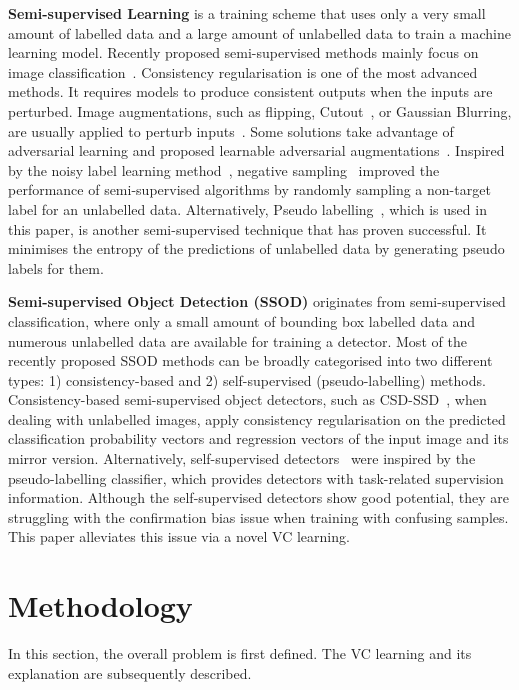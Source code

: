 \documentclass[runningheads]{llncs}
\begin{document}
\vspace{0.5em}\noindent\textbf{Semi-supervised Learning} is a training scheme that uses only a very small amount of labelled data and a large amount of unlabelled data to train a machine learning model. Recently proposed semi-supervised methods mainly focus on image classification~\cite{Kihyuk_2020_Fix,David_2019_Mix}. Consistency regularisation is one of the most advanced methods. It requires models to produce consistent outputs when the inputs are perturbed. Image augmentations, such as flipping, Cutout~\cite{Terrance_2017_Imp}, or Gaussian Blurring, are usually applied to perturb inputs~\cite{Samuli_2017_Tem,Philip_2014_Lea}. Some solutions take advantage of adversarial learning and proposed learnable adversarial augmentations~\cite{Takeru_2019_Vir}. Inspired by the noisy label learning method~\cite{kim2019nlnl}, negative sampling~\cite{chen2020negative} improved the performance of semi-supervised algorithms by randomly sampling a non-target label for an unlabelled data. Alternatively, Pseudo labelling~\cite{Lee_2013_Pse}, which is used in this paper, is another semi-supervised technique that has proven successful. It minimises the entropy of the predictions of unlabelled data by generating pseudo labels for them.

\vspace{0.5em}\noindent\textbf{Semi-supervised Object Detection (SSOD)} originates from semi-supervised classification, where only a small amount of bounding box labelled data and numerous unlabelled data are available for training a detector. Most of the recently proposed SSOD methods can be broadly categorised into two different types: 1) consistency-based and 2) self-supervised (pseudo-labelling) methods. Consistency-based semi-supervised object detectors, such as CSD-SSD~\cite{Jisoo_2019_Con}, when dealing with unlabelled images, apply consistency regularisation on the predicted classification probability vectors and regression vectors of the input image and its mirror version. Alternatively, self-supervised detectors~\cite{Yen-Cheng_2021_Unb,Qiang_2021_Ins,Qize_2021_Int,Kihyuk_2020_SATC} were inspired by the pseudo-labelling classifier, which provides detectors with task-related supervision information. Although the self-supervised detectors show good potential, they are struggling with the confirmation bias issue when training with confusing samples. This paper alleviates this issue via a novel VC learning.

\section{Methodology}
In this section, the overall problem is first defined. The VC learning and its explanation are subsequently described.
\end{document}
